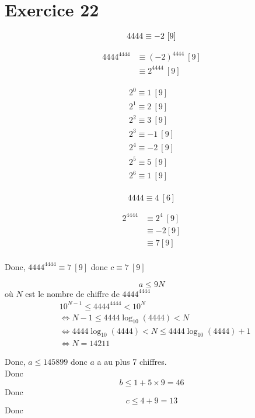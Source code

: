 \part{Exercice 22}

\[
	4444 \equiv -2 ~[9]\\
\] 

\begin{align*}
	4444^{4444} &\equiv (-2)^{4444} ~[9]\\
	&\equiv 2^{4444} ~[9]
\end{align*}

\begin{align*}
	2^0 \equiv 1 ~[9]\\
	2^1 \equiv 2 ~[9]\\
	2^2 \equiv 3 ~[9]\\
	2^3 \equiv -1 ~[9]\\
	2^4 \equiv -2 ~[9]\\
	2^5 \equiv 5 ~[9]\\
	2^6 \equiv 1 ~[9]\\
\end{align*}

\[
4444 \equiv 4 ~[6]
\] 

\begin{align*}
	2^{4444} &\equiv 2^4~[9]\\
					 &\equiv -2[9]\\
					 &\equiv 7[9]\\
\end{align*}

Donc, $4444^{4444} \equiv 7~[9]$ donc  $c \equiv 7~[9]$

 \[
a\le 9N
\] où $N$ est le nombre de chiffre de $4444^{4444}$  
\begin{align*}
	&10^{N-1} \le 4444^{4444} < 10^N\\
	&\iff N-1 \le  4444 \log_{10}(4444) < N\\
	&\iff 4444\log_{10}(4444) < N \le 4444\log_{10}(4444)+1\\
	&\iff N = 14211
\end{align*}

Donc, $a \le 145899$ donc $a$ a au plus 7 chiffres.\\
Donc \[
	b \le 1 + 5 \times  9 = 46
\] Donc \[
	c \le 4+9 = 13
\] Donc 


